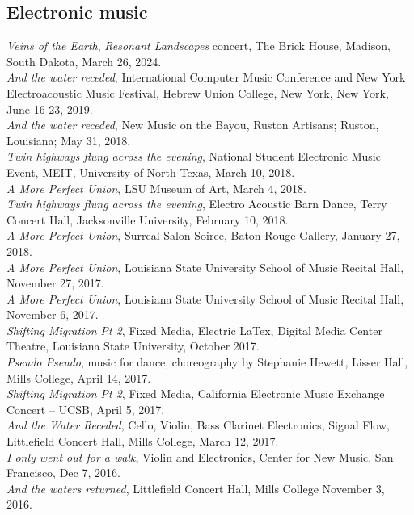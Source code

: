 \documentclass[10pt, a4paper]{article}
\newcommand{\years}[1]{\marginnote{\scriptsize #1}}
\begin{document}
\subsection*{Electronic music}
\years{2024} \textit{Veins of the Earth}, \textit{Resonant Landscapes} concert, The Brick House, Madison, South Dakota, March 26, 2024. \\
\years{2019} \textit{And the water receded}, International Computer Music Conference and New York Electroacoustic Music Festival, Hebrew Union College, New York, New York, June 16-23, 2019. \\
\years{2018} \textit{And the water receded}, New Music on the Bayou, Ruston Artisans; Ruston, Louisiana; May 31, 2018. \\  
\textit{Twin highways flung across the evening}, National Student Electronic Music Event, MEIT, University of North Texas, March 10, 2018. \\
\textit{A More Perfect Union}, LSU Museum of Art, March 4, 2018. \\
\textit{Twin highways flung across the evening}, Electro Acoustic Barn Dance, Terry Concert Hall, Jacksonville University, February 10, 2018. \\
\textit{A More Perfect Union}, Surreal Salon Soiree, Baton Rouge Gallery, January 27, 2018.\\
\years{2017}\textit{A  More Perfect Union}, Louisiana State University School of Music Recital Hall, November 27, 2017. \\
\textit{A More Perfect Union}, Louisiana State University School of Music Recital Hall, November 6, 2017.\\
\textit{Shifting Migration Pt 2}, Fixed Media, Electric LaTex, Digital Media Center Theatre, Louisiana State University, October 2017.\\
\textit{Pseudo Pseudo}, music for dance, choreography by Stephanie Hewett, Lisser Hall, Mills College, April 14, 2017. \\
\textit{Shifting Migration Pt 2}, Fixed Media, California Electronic Music Exchange Concert – UCSB, April 5, 2017.\\
\textit{And the Water Receded}, Cello, Violin, Bass Clarinet Electronics, Signal Flow, Littlefield Concert Hall, Mills College, March 12, 2017.\\
\years{2016} \textit{I only went out for a walk}, Violin and Electronics, Center for New Music, San Francisco, Dec 7, 2016. \\
\textit{And the waters returned}, Littlefield Concert Hall, Mills College November 3, 2016.\\
\end{document}
